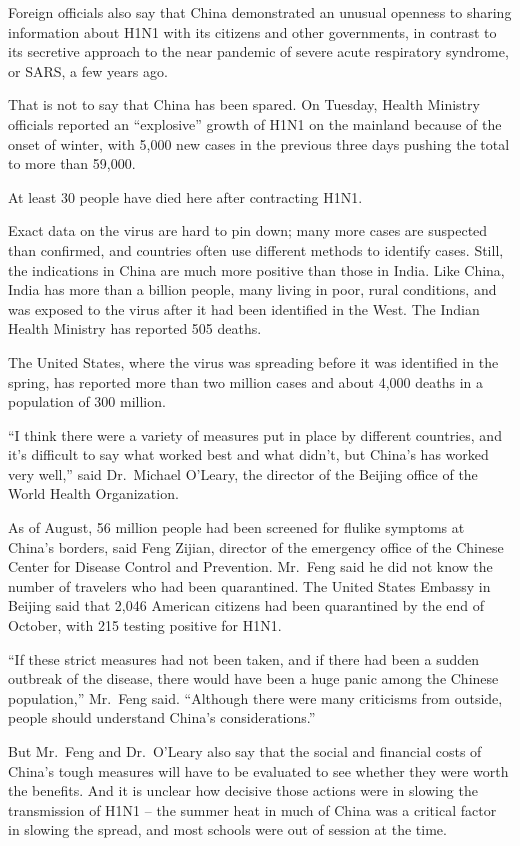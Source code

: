 ﻿\documentclass[12pt]{article}
\begin{document}
Foreign officials also say that China demonstrated an unusual openness to sharing information about
H1N1 with its citizens and other governments, in contrast to its secretive approach to the near
pandemic\cite{pandemic} of severe acute respiratory syndrome, or SARS, a few years ago.

That is not to say that China has been spared. On Tuesday, Health Ministry officials reported an
``explosive'' growth of H1N1 on the mainland because of the onset of winter, with 5,000 new cases in
the previous three days pushing the total to more than 59,000.

At least 30 people have died here after contracting H1N1.

Exact data on the virus are hard to pin down; many more cases are suspected than confirmed, and
countries often use different methods to identify cases. Still, the indications in China are much
more positive than those in India. Like China, India has more than a billion people, many living in
poor, rural conditions, and was exposed to the virus after it had been identified in the West. The
Indian Health Ministry has reported 505 deaths.

The United States, where the virus was spreading before it was identified in the spring, has
reported more than two million cases and about 4,000 deaths in a population of 300 million.

``I think there were a variety of measures put in place by different countries, and it's difficult
to say what worked best and what didn't, but China's has worked very well,'' said Dr.~Michael
O'Leary, the director of the Beijing office of the World Health Organization.

As of August, 56 million people had been screened for flulike symptoms at China's borders, said Feng
Zijian, director of the emergency office of the Chinese Center for Disease Control and Prevention.
Mr.~Feng said he did not know the number of travelers who had been quarantined. The United States
Embassy in Beijing said that 2,046 American citizens had been quarantined by the end of October,
with 215 testing positive for H1N1.

``If these strict measures had not been taken, and if there had been a sudden outbreak of the
disease, there would have been a huge panic among the Chinese population,'' Mr.~Feng said.
``Although there were many criticisms from outside, people should understand China's
considerations.''

But Mr.~Feng and Dr.~O'Leary also say that the social and financial costs of China's tough measures
will have to be evaluated to see whether they were worth the benefits. And it is unclear how
decisive those actions were in slowing the transmission of H1N1 -- the summer heat in much of China
was a critical factor in slowing the spread, and most schools were out of session at the time.
\end{document}
